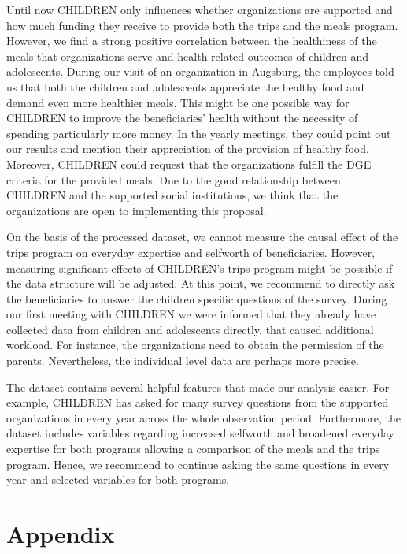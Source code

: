 \documentclass[12pt, a4paper, titlepage]{article}\usepackage[]{graphicx}\usepackage[]{color}
\begin{document}
Until now CHILDREN only influences whether organizations are supported and how much funding they receive to provide both the trips and the meals program. However, we find a strong positive correlation between the healthiness of the meals that organizations serve and health related outcomes of children and adolescents. During our visit of an organization in Augsburg, the employees told us that both the children and adolescents appreciate the healthy food and demand even more healthier meals. This might be one possible way for CHILDREN to improve the beneficiaries’ health without the necessity of spending particularly more money. In the yearly meetings, they could point out our results and mention their appreciation of the provision of healthy food. Moreover, CHILDREN could request that the organizations fulfill the DGE criteria for the provided meals. Due to the good relationship between CHILDREN and the supported social institutions, we think that the organizations are open to implementing this proposal.

On the basis of the processed dataset, we cannot measure the causal effect of the trips program on everyday expertise and selfworth of beneficiaries. However, measuring significant effects of CHILDREN’s trips program might be possible if the data structure will be adjusted. At this point, we recommend to directly ask the beneficiaries to answer the children specific questions of the survey. During our first meeting with CHILDREN we were informed that they already have collected data from children and adolescents directly, that caused additional workload. For instance, the organizations need to obtain the permission of the parents. Nevertheless, the individual level data are perhaps more precise.

The dataset contains several helpful features that made our analysis easier. For example, CHILDREN has asked for many survey questions from the supported organizations in every year across the whole observation period. Furthermore, the dataset includes variables regarding increased selfworth and broadened everyday expertise for both programs allowing a comparison of the meals and the trips program. Hence, we recommend to continue asking the same questions in every year and selected variables for both programs. 


\printbibliography

\section{Appendix}
\end{document}
